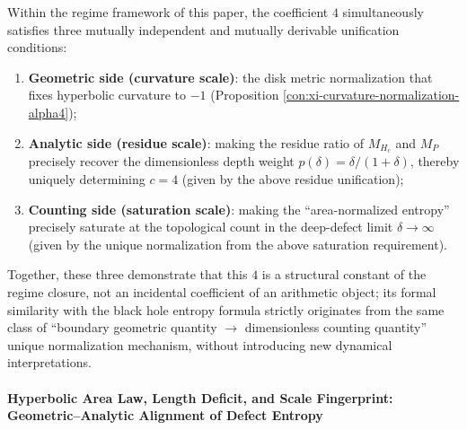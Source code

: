 \begin{proposition}
Within the regime framework of this paper, the coefficient \(4\) simultaneously satisfies three mutually independent and mutually derivable unification conditions:
\begin{enumerate}
  \item \textbf{Geometric side (curvature scale)}: the disk metric normalization that fixes hyperbolic curvature to \(-1\) (Proposition \ref{con:xi-curvature-normalization-alpha4});
  \item \textbf{Analytic side (residue scale)}: making the residue ratio of \(M_{H_c}\) and \(M_P\) precisely recover the dimensionless depth weight \(p(\delta)=\delta/(1+\delta)\), thereby uniquely determining \(c=4\) (given by the above residue unification);
  \item \textbf{Counting side (saturation scale)}: making the ``area-normalized entropy'' precisely saturate at the topological count in the deep-defect limit \(\delta\to\infty\) (given by the unique normalization from the above saturation requirement).
\end{enumerate}
Together, these three demonstrate that this \(4\) is a structural constant of the regime closure, not an incidental coefficient of an arithmetic object; its formal similarity with the black hole entropy formula strictly originates from the same class of ``boundary geometric quantity \(\to\) dimensionless counting quantity'' unique normalization mechanism, without introducing new dynamical interpretations.
\end{proposition}

\paragraph{Hyperbolic Area Law, Length Deficit, and Scale Fingerprint: Geometric--Analytic Alignment of Defect Entropy}

